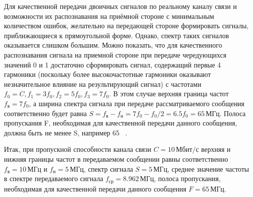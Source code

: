 Для качественной передачи двоичных сигналов по реальному каналу связи и возможности их распознавания на приёмной стороне с минимальным количеством ошибок, желательно на передающей стороне формировать сигналы, приближающиеся к прямоугольной форме. Однако, спектр таких сигналов оказывается слишком большим. Можно показать, что для качественного распознавания сигнала на приемной стороне при передаче чередующихся значений 0 и 1 достаточно сформировать сигнал, содержащий первые 4 гармоники (поскольку более высокочастотные гармоники оказывают незначительное влияние на результирующий сигнал) с частотами $f_0=C, f_1=3f_0, f_2=5f_0, f_3=7f_0$. В этом случае верхняя граница частот $f_{\text{в}}=7f_0$, а ширина спектра сигнала при передаче рассматриваемого сообщения соответственно будет равна $S = f_{\text{в}} - f_{\text{н}} = 7f_0-f_0/2=6.5f_0=65 \, \text{МГц}$. Полоса пропускания F, необходимая для качественной передачи данного сообщения, должна быть не менее S, например 65 \, .

Итак, при пропускной способности канала связи $C = 10 \, \text{Мбит/с}$ верхняя и нижняя границы частот в передаваемом сообщении равны соответственно $f_{\text{в}} = 10 \, \text{МГц}$ и $f_{\text{н}} = 5 \, \text{МГц}$, спектр сигнала $S = 5 \, \text{МГц}$, среднее значение частоты в спектре передаваемого сигнала $f_{\text{ср}} = 8.962 \, \text{МГц}$, полоса пропускания, необходимая для качественной передачи данного сообщения $F=65 \, \text{МГц}$.
